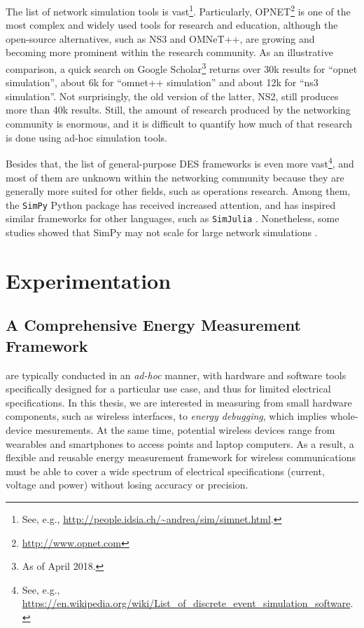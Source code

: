 \documentclass[twoside,nohyper]{tufte-book}
\newcommand{\partseparator}{
  \noindent\leavevmode\leaders\hrule height 0.8ex depth \dimexpr0.4pt-0.8ex\hfill\kern0pt
  \newline~\vspace{-0.5\baselineskip}\newline}
\theoremstyle{definition}
\theoremstyle{definition}
\theoremstyle{definition}
\theoremstyle{remark}
\begin{document}
The list of network simulation tools is vast\footnote{See, e.g.,
  \url{http://people.idsia.ch/~andrea/sim/simnet.html}.}. Particularly,
OPNET\footnote{\url{http://www.opnet.com}} is one of the most complex
and widely used tools for research and education, although the
open-source alternatives, such as NS3 and OMNeT++, are growing and
becoming more prominent within the research community. As an
illustrative comparison, a quick search on Google Scholar\footnote{As of
  April 2018.} returns over 30k results for ``opnet simulation'', about
6k for ``omnet++ simulation'' and about 12k for ``ns3 simulation''. Not
surprisingly, the old version of the latter, NS2, still produces more
than 40k results. Still, the amount of research produced by the
networking community is enormous, and it is difficult to quantify how
much of that research is done using ad-hoc simulation tools.

Besides that, the list of general-purpose DES frameworks is even more
vast\footnote{See, e.g.,
  \url{https://en.wikipedia.org/wiki/List_of_discrete_event_simulation_software}.},
and most of them are unknown within the networking community because
they are generally more suited for other fields, such as operations
research. Among them, the \texttt{SimPy} Python
package\cite[0pt]{SimPy}
has received increased attention, and has inspired similar frameworks
for other languages, such as \texttt{SimJulia} \citep{GitHub:SimJulia}.
Nonetheless, some studies showed that SimPy may not scale for large
network simulations \citep[\citet{weingartner2009}]{bahouth2007}.

\addtocontents{toc}{\partseparator}

\hypertarget{part-experimentation}{%
\part{Experimentation}\label{part-experimentation}}

\hypertarget{ch:03}{%
\chapter{A Comprehensive Energy Measurement Framework}\label{ch:03}}

 are typically conducted in an
\emph{ad-hoc} manner, with hardware and software tools specifically
designed for a particular use case, and thus for limited electrical
specifications. In this thesis, we are interested in measuring from
small hardware components, such as wireless interfaces, to \emph{energy
debugging}\cite[0pt]{Pathak2011},
which implies whole-device mesurements. At the same time, potential
wireless devices range from wearables and smartphones to access points
and laptop computers. As a result, a flexible and reusable energy
measurement framework for wireless communications must be able to cover
a wide spectrum of electrical specifications (current, voltage and
power) without losing accuracy or precision.
\end{document}
